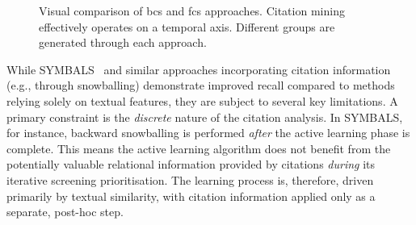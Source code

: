 \documentclass[10pt,oneside]{book}
\begin{document}
\begin{figure}[t]
\begin{center}

\caption{Visual comparison of \gls*{bcs} and \gls*{fcs} approaches. Citation mining effectively operates on a temporal axis. Different groups are generated through each approach.}
\end{center}
\label{fig:bcs-fcs-explained}
\end{figure}


While SYMBALS~\cite{van_haastrecht_symbals_2021} and similar approaches incorporating citation information (e.g., through snowballing) demonstrate improved recall compared to methods relying solely on textual features, they are subject to several key limitations.  A primary constraint is the \emph{discrete} nature of the citation analysis.  In SYMBALS, for instance, backward snowballing is performed \emph{after} the active learning phase is complete.  This means the active learning algorithm does not benefit from the potentially valuable relational information provided by citations \emph{during} its iterative screening prioritisation.  The learning process is, therefore, driven primarily by textual similarity, with citation information applied only as a separate, post-hoc step.
\end{document}
